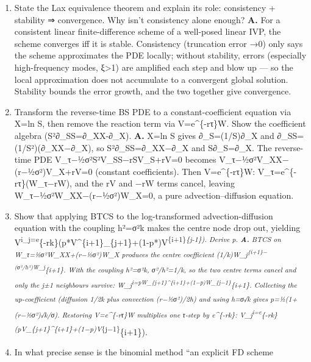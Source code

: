 \documentclass[
  11pt,
]{article}
\begin{document}
\begin{enumerate}
  which by symmetry kills the leading O(k) term, leaving O(k²). It is
  still one tridiagonal solve per step like BTCS, so it gains an order
  in time at the same per-step cost --- hence preferred (caveat: it can
  oscillate on non-smooth payoffs).
\item
  State the Lax equivalence theorem and explain its role: consistency +
  stability ⇒ convergence. Why isn't consistency alone enough?
  \textbf{A.} For a consistent linear finite-difference scheme of a
  well-posed linear IVP, the scheme converges iff it is stable.
  Consistency (truncation error →0) only says the scheme approximates
  the PDE locally; without stability, errors (especially high-frequency
  modes, \textbar ξ\textbar\textgreater1) are amplified each step and
  blow up --- so the local approximation does not accumulate to a
  convergent global solution. Stability bounds the error growth, and the
  two together give convergence.
\item
  Transform the reverse-time BS PDE to a constant-coefficient equation
  via X=ln S, then remove the reaction term via V=e\^{}\{-rτ\}W. Show
  the coefficient algebra (S²∂\_SS=∂\_XX-∂\_X). \textbf{A.} X=ln S gives
  ∂\_S=(1/S)∂\_X and ∂\_SS=(1/S²)(∂\_XX−∂\_X), so S²∂\_SS=∂\_XX−∂\_X and
  S∂\_S=∂\_X. The reverse-time PDE V\_τ−½σ²S²V\_SS−rSV\_S+rV=0 becomes
  V\_τ−½σ²V\_XX−(r−½σ²)V\_X+rV=0 (constant coefficients). Then
  V=e\^{}\{-rτ\}W: V\_τ=e\^{}\{-rτ\}(W\_τ−rW), and the rV and −rW terms
  cancel, leaving W\_τ−½σ²W\_XX−(r−½σ²)W\_X=0, a pure
  advection--diffusion equation.
\item
  Show that applying BTCS to the log-transformed advection-diffusion
  equation with the coupling h²=σ²k makes the centre node drop out,
  yielding
  V\textsuperscript{i\_j=e}\{-rk\}(p*V\^{}\{i+1\}\_\{j+1\}+(1-p*)V\textsuperscript{\{i+1\}\emph{\{j-1\}).
  Derive p\emph{. \textbf{A.} BTCS on W\_τ=½σ²W\_XX+(r−½σ²)W\_X produces
  the centre coefficient
  (1/k)W\_j\textsuperscript{\{i+1\}−(σ²/h²)W\_j}\{i+1\}. With the
  coupling h²=σ²k, σ²/h²=1/k, so the two centre terms cancel and only
  the j±1 neighbours survive:
  W\_j\textsuperscript{i=p\emph{W\_\{j+1\}\^{}\{i+1\}+(1−p})W\_\{j−1\}}\{i+1\}.
  Collecting the up-coefficient (diffusion 1/2k plus convection
  (r−½σ²)/2h) and using h=σ√k gives p}=½(1+(r−½σ²)√k/σ). Restoring
  V=e\^{}\{-rτ\}W multiplies one τ-step by e\^{}\{-rk\}:
  V\_j\textsuperscript{i=e}\{-rk\}(p\emph{V\_\{j+1\}\^{}\{i+1\}+(1−p})V}\{j−1\}}\{i+1\}).
\item
  In what precise sense is the binomial method ``an explicit FD scheme

\end{enumerate}
\end{document}

